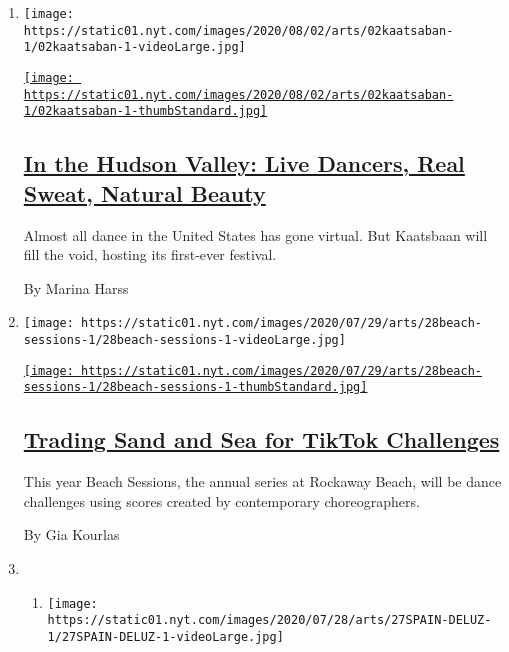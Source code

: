 \begin{enumerate}
\def\labelenumi{\arabic{enumi}.}
\item
  \texttt{[image: https://static01.nyt.com/images/2020/08/02/arts/02kaatsaban-1/02kaatsaban-1-videoLarge.jpg]}

  \href{/2020/07/29/arts/dance/kaatsbaan-dance-festival-stella-abrera.html}{\texttt{[image: https://static01.nyt.com/images/2020/08/02/arts/02kaatsaban-1/02kaatsaban-1-thumbStandard.jpg]}}

  \hypertarget{in-the-hudson-valley-live-dancers-real-sweat-natural-beauty}{%
  \subsection{\texorpdfstring{\href{/2020/07/29/arts/dance/kaatsbaan-dance-festival-stella-abrera.html}{In
  the Hudson Valley: Live Dancers, Real Sweat, Natural
  Beauty}}{In the Hudson Valley: Live Dancers, Real Sweat, Natural Beauty}}\label{in-the-hudson-valley-live-dancers-real-sweat-natural-beauty}}

  Almost all dance in the United States has gone virtual. But Kaatsbaan
  will fill the void, hosting its first-ever festival.

  By Marina Harss
\item
  \texttt{[image: https://static01.nyt.com/images/2020/07/29/arts/28beach-sessions-1/28beach-sessions-1-videoLarge.jpg]}

  \href{/2020/07/28/arts/dance/beach-sessions-rockaway-tiktok.html}{\texttt{[image: https://static01.nyt.com/images/2020/07/29/arts/28beach-sessions-1/28beach-sessions-1-thumbStandard.jpg]}}

  \hypertarget{trading-sand-and-sea-for-tiktok-challenges}{%
  \subsection{\texorpdfstring{\href{/2020/07/28/arts/dance/beach-sessions-rockaway-tiktok.html}{Trading
  Sand and Sea for TikTok
  Challenges}}{Trading Sand and Sea for TikTok Challenges}}\label{trading-sand-and-sea-for-tiktok-challenges}}

  This year Beach Sessions, the annual series at Rockaway Beach, will be
  dance challenges using scores created by contemporary choreographers.

  By Gia Kourlas
\item
  \begin{enumerate}
  \def\labelenumii{\arabic{enumii}.}
  \item
    \texttt{[image: https://static01.nyt.com/images/2020/07/28/arts/27SPAIN-DELUZ-1/27SPAIN-DELUZ-1-videoLarge.jpg]}


\end{enumerate}
\end{enumerate}
